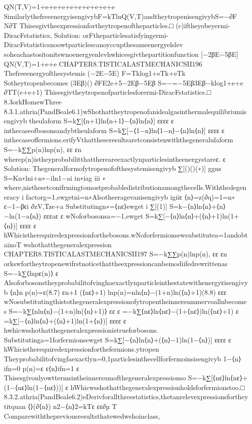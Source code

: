 {{{{{{{{{{QN(T,V)=1+e+e+e+e+e+e+e+e+e
SimilarlythefreeenergyisengivybF=kTlnQ(V,T)andtheytropenisengivybS=−∂F
N∂T
Thisesgivtheexpressionfortheytropenoftheparticles.□
(c)iftheyobeyermi-DiracFstatistics,
Solution:
orFtheparticlesatisfyingermi-DiracFstatisticsnoowtparticlescanoyccupthesameenergyelslev
soheachastositonitswnoenergyenlevhwhicesgivthepartitionfunction
[−2βE−5βE]
QN(V,T)=1+e+e
CHAPTER8.TISTICALASTMECHANICSII196
Thefreeenergyofthesystemis
(−2E−5E)
F=Tklog1+eTk+eTk
Sotheytropenbecomes
(3Eβ)()
∂FE2e+5−2Eβ−5Eβ
S=−=−5Eβ3Eβ−klog1+e+e
∂TT(e+e+1)
Thisesgivtheytropenofparticlesforermi-DiracFstatistics.□
8.3orkHomewThree
8.3.1.athria(PandBeale6.1)wShothattheytropenofanidealgasinthermalequilibriumisengivyb
theulaform
S=k∑[⟨n+1⟩ln⟨n+1⟩−⟨n⟩ln⟨n⟩]
εεεε
ε
inthecaseofbosonsandybtheulaform
S=k∑[−⟨1−n⟩ln⟨1−n⟩−⟨n⟩ln⟨n⟩]
εεεε
ε
inthecaseoffermions.erifyVthattheseresultsaretconsistenwiththegeneralulaform
S=−k∑{∑p(n)lnp(n)},
εε
εn
wherep(n)istheyprobabilitthatthereareexactlynparticlesintheenergystareε.
ε
Solution:
Thegeneralformofytropenofofthesystemisengivyb
∑[()()(∗)]
ggns
S=Kn∗lni+n∗−iln1−ai
in∗iag
iii
∗
where,nisthesetconifrmingtomostprobabledistributionamongthecells.Withthedegeneracy
i
factorg=1,ewgetni=n∗Alsotheeragevanisengivyb
igiiε
⟨n⟩=z(∂q)=1=n∗
ε−1−βϵi
∂zV,Tze+a
Substitutingn∗=⟨nε⟩ewget
i
∑[(1)]
S=k−⟨n⟩ln⟨n⟩+⟨n⟩−ln(1−a⟨n⟩)
εεεaε
ε
wNoforbosonsa=−1,ewget
S=k∑[−⟨n⟩ln⟨n⟩+(⟨n⟩+1)ln(1+⟨n⟩)]
εεεε
ε
hWhicistherequiredexpressionforthebosons.wNoforfermionsewsubstitutea=1andobtainoT
wshothatthegeneralexpression
CHAPTER8.TISTICALASTMECHANICSII197
S=−k∑{∑p(n)lnp(n)},
εε
εn
orkswfortheytropenewifrstnoticethattheexpressioncanbemodiifedrewrittenas
S=−k∑⟨lnpε(n)⟩
ε
Alsoforbosonstheyprobabilitofvinghaexactlynparticleinthestatewithenergyεisengivyb
⟨n⟩n
p(n)=ε(8.7)
εn+1
(⟨nε⟩+1)
lnp(n)=nln⟨n⟩−(1+n)ln(⟨n⟩+1)(8.8)
εεε
wNosubstitutingthistothegeneralexpressionofytropentheinnersummervoallnbecomes
S=−k∑⟨nln⟨n⟩−(1+n)ln(⟨n⟩+1)⟩
εε
ε
=−k∑⟨nε⟩ln⟨nε⟩−(1+⟨nε⟩)ln(⟨nε⟩+1)
ε
=k∑[−⟨n⟩ln⟨n⟩+(⟨n⟩+1)ln(1+⟨n⟩)]
εεεε
ε
hwhicwsshothatthegeneralexpressionistrueforbosons.
Substitutinga=1forfermionsewget
S=k∑[−⟨n⟩ln⟨n⟩+(⟨n⟩−1)ln(1−⟨n⟩)]
εεεε
ε
hWhicistherequiredexpressionforthefermions.ytropen
Theyprobabilitofvingfaexactlyn={0,1}particlesinthecellforfermoinsisengivyb
{
1−⟨n⟩ifn=0
p(n)=ε
ε⟨n⟩ifn=1
ε
Thisesgivonlyowttermsintheinnersumofthegeneralexpressionso
S=−k∑[⟨nε⟩ln⟨nε⟩+(1−⟨nε⟩ln(1−⟨nε⟩))]
ε
hWhicwsshothatthegeneralexpressionholdsforfermionstoo.□
8.3.2.athria(PandBeale6.2)eDerivforallthreestatistics,thetanrelevexpressionsfortheytitquan
⟨⟩(∂⟨n⟩)
n2−⟨n⟩2=kTε
εε∂µ
T
Comparewiththepreviousresultsthatewedwshoinclass,
}}}}}}}}}}}
